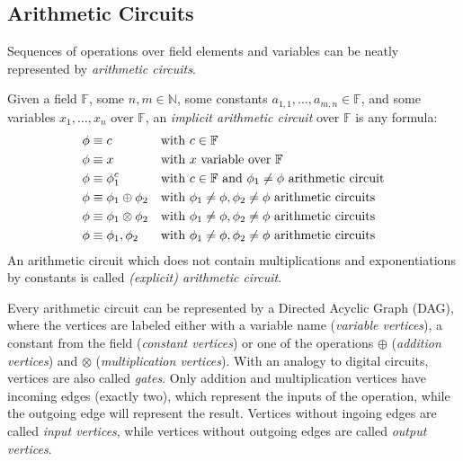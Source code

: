 
\subsection{Arithmetic Circuits}
Sequences of operations over field elements and variables can be neatly represented by
\emph{arithmetic circuits}.
\begin{definition}
	Given a field \(\mathbb{F}\), some \(n, m \in \mathbb{N}\), some constants
	\(a_{1, 1}, \dots, a_{m, n} \in \mathbb{F}\), and some variables \(x_1, \dots, x_n \) over
	\(\mathbb{F}\), an \emph{implicit arithmetic circuit} over \(\mathbb{F}\) is any formula:
	\begin{align*}
		 & \phi \equiv c                     &  & \textnormal{with \(c \in \mathbb{F}\)}
		\\
		 & \phi \equiv x                     &  & \textnormal{with \(x\) variable over
			\(\mathbb{F}\)}
		\\
		 & \phi \equiv \phi_1^c              &  & \textnormal{with \(c \in \mathbb{F}\) and
			\(\phi_1 \neq \phi \) arithmetic circuit}
		\\
		 & \phi \equiv \phi_1 \oplus \phi_2  &  & \textnormal{with \(\phi_1 \neq \phi, \phi_2 \neq
			\phi \)
			arithmetic circuits}
		\\
		 & \phi \equiv \phi_1 \otimes \phi_2 &  & \textnormal{with \(\phi_1 \neq \phi, \phi_2 \neq
			\phi \)
			arithmetic circuits}
		\\
		 & \phi \equiv \phi_1, \phi_2        &  & \textnormal{with \(\phi_1 \neq \phi, \phi_2 \neq
			\phi \)
			arithmetic circuits}
	\end{align*}
	An arithmetic circuit which does not contain multiplications and exponentiations by constants
	is called \emph{(explicit) arithmetic circuit}.
\end{definition}

\noindent Every arithmetic circuit can be represented by a Directed Acyclic Graph (DAG),
where the vertices are labeled either with a variable name (\emph{variable vertices}), a constant
from the field (\emph{constant vertices}) or one of the operations \(\oplus \)
(\emph{addition vertices}) and \(\otimes \) (\emph{multiplication vertices}).
With an analogy to digital circuits, vertices are also called \emph{gates}.
Only addition and multiplication vertices have incoming edges (exactly two), which represent the
inputs of the operation, while the outgoing edge will represent the result.
Vertices without ingoing edges are called \emph{input vertices}, while vertices without outgoing
edges are called \emph{output vertices}.


